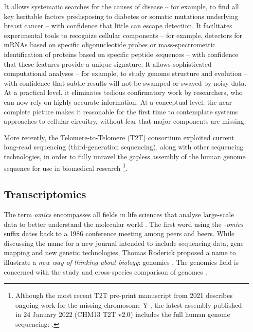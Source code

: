 \begin{displayquote}
It allows systematic searches for the causes of disease -- for example, to find all key heritable factors predisposing to diabetes or somatic mutations underlying breast cancer -- with confidence that little can escape detection. It facilitates experimental tools to recognize cellular components -- for example, detectors for mRNAs based on specific oligonucleotide probes or mass-spectrometric identification of proteins based on specific peptide sequences -- with confidence that these features provide a unique signature. It allows sophisticated computational analyses -- for example, to study genome structure and evolution -- with confidence that subtle results will not be swamped or swayed by noisy data. At a practical level, it eliminates tedious confirmatory work by researchers, who can now rely on highly accurate information. At a conceptual level, the near-complete picture makes it reasonable for the first time to contemplate systems approaches to cellular circuitry, without fear that major components are missing.
\end{displayquote}

More recently, the Telomere-to-Telomere (T2T) consortium exploited current long-read sequencing (third-generation sequencing), along with other sequencing technologies, in order to fully unravel the gapless assembly of the human genome sequence for use in biomedical research \cite{nurk:2021up} \footnote{Although the most recent T2T pre-print manuscript from 2021 describes ongoing work for the missing chromosome Y \cite{nurk:2021up}, the latest assembly published in 24 January 2022 (CHM13 T2T v2.0) includes the full human genome sequencing: .}.

\subsection{Transcriptomics}

The term \emph{omics} encompasses all fields in life sciences that analyse large-scale data to better understand the molecular world \cite{yadav:2007uy}. The first word using the \emph{-omics} suffix dates back to a 1986 conference meeting among peers and beers. While discussing the name for a new journal intended to include sequencing data, gene mapping and new genetic technologies, Thomas Roderick proposed a name to illustrate a \emph{new way of thinking about biology}: genomics \cite{yadav:2007uy,kuska:1998ta}. The genomics field is concerned with the study and cross-species comparison of genomes \cite{kuska:1998ta}.


